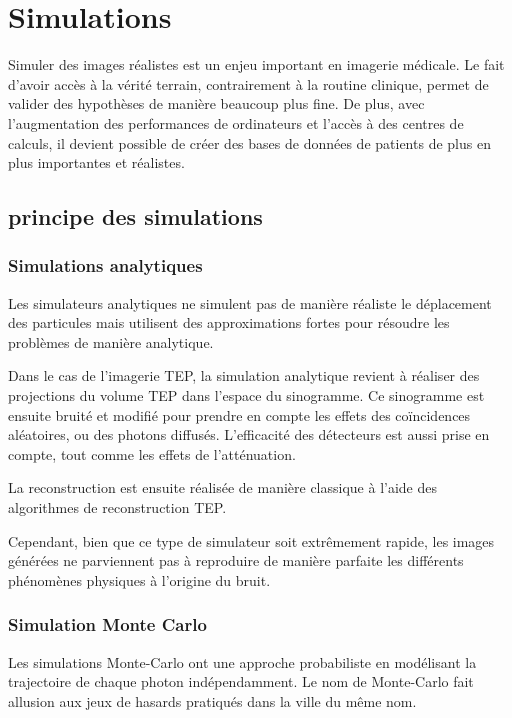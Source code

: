\chapter{Simulations}

Simuler des images réalistes est un enjeu important en imagerie médicale. Le fait d'avoir accès à la vérité terrain, contrairement à la routine clinique, permet de valider des hypothèses de manière beaucoup plus fine. De plus, avec l'augmentation des performances de ordinateurs et l'accès à des centres de calculs, il devient possible de créer des bases de données de patients de plus en plus importantes et réalistes.


	\section{principe des simulations}

		\subsection{Simulations analytiques}

Les simulateurs analytiques ne simulent pas de manière réaliste le déplacement des particules mais  utilisent des approximations fortes pour résoudre les problèmes de manière analytique.

Dans le cas de l'imagerie TEP, la simulation analytique revient à réaliser des projections du volume TEP dans l'espace du sinogramme. Ce sinogramme est ensuite bruité et modifié pour prendre en compte les effets des coïncidences aléatoires, ou des photons diffusés. L'efficacité des détecteurs est aussi prise en compte, tout comme les effets de l'atténuation. 

La reconstruction est ensuite réalisée de manière classique à l'aide des algorithmes de reconstruction TEP.


Cependant, bien que ce type de simulateur soit extrêmement rapide, les images générées ne parviennent pas à reproduire de manière parfaite les différents phénomènes physiques à l'origine du bruit.

		\subsection{Simulation Monte Carlo}

Les simulations Monte-Carlo ont une approche probabiliste en modélisant la trajectoire de chaque photon indépendamment. Le nom de Monte-Carlo fait allusion aux jeux de hasards pratiqués dans la ville du même nom.

